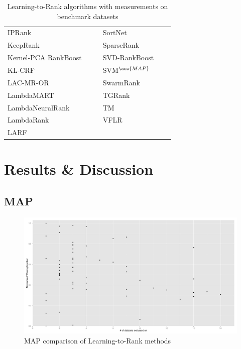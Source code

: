 \begin{table}[!h!p]
{\begin{tabular}{|l|l|l||l|l|l|}
\acs{IP}Rank & \cite{Wang2009b} & \cite{Wang2009b, Torkestani2012} & SortNet & \cite{Rigutini2008} & \cite{Rigutini2008,Freno2011} \\
KeepRank & \cite{Chen2009} & \cite{Chen2009} & SparseRank & \cite{Lai2013b} & \cite{Lai2013b} \\ 
Kernel-\acs{PCA} RankBoost & \cite{Duh2008} & \cite{Duh2008, Sato2013} & \acs{SVD}-RankBoost & \cite{Lin2009} & \cite{Lin2009} \\
KL-\acs{CRF} & \cite{Volkovs2011} & \cite{Volkovs2011} & \acs{SVM}$^{\acs{MAP}}$ & \cite{Yue2007} & \cite{Wang2012, Xu2008, Niu2012} \\ 
LAC-MR-OR & \cite{Veloso2008} & \cite{Veloso2008} & SwarmRank & \cite{Diaz-Aviles2009} & \cite{Sato2013} \\ 
LambdaMART & \cite{Burges2010} & \cite{Asadi2013a, Ganjisaffar2011c} & TGRank & \cite{Lai2013} & \cite{Lai2013} \\ 
LambdaNeuralRank & \cite{Papini2012} & \cite{Papini2012} & TM & \cite{Zhou2008} & \cite{Zhou2008, Papini2012, Tan2013} \\ 
LambdaRank & \cite{Burges2006} &  & VFLR & \cite{Cai2012} & \cite{Cai2012} \\ 
LARF & \cite{Torkestani2012} & \cite{Torkestani2012} &  &  &  \\ 
\end{tabular}}
\caption{Learning-to-Rank algorithms with measurements on benchmark datasets}
\label{tab:ltr_methods_used}
\end{table}

\section{Results \& Discussion}
\subsection{MAP}
\begin{figure}[!h]
\includegraphics[scale=0.35]{gfx/map_winnum}
\caption{\acs{MAP} comparison of Learning-to-Rank methods}
\label{fig:normalised_winning_number_map}
\end{figure}

